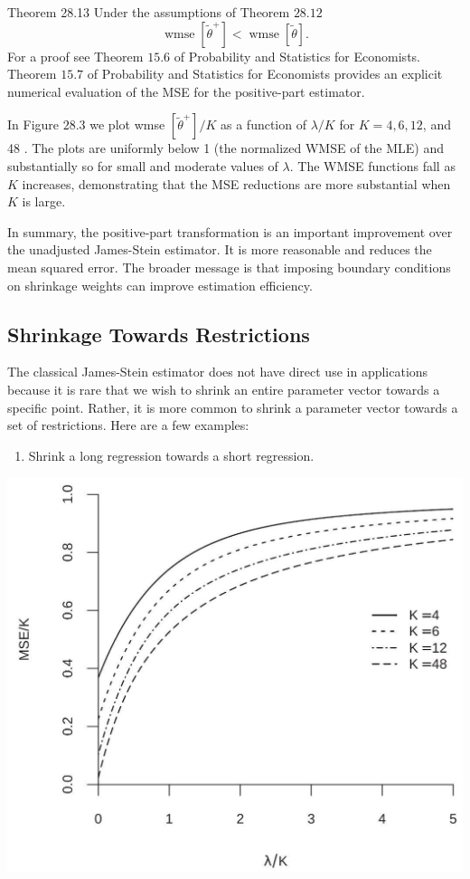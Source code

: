 \documentclass[10pt]{article}
\begin{document}
Theorem 28.13 Under the assumptions of Theorem $28.12$
$$
\operatorname{wmse}\left[\widetilde{\theta}^{+}\right]<\operatorname{wmse}[\tilde{\theta}] .
$$
For a proof see Theorem $15.6$ of Probability and Statistics for Economists. Theorem $15.7$ of Probability and Statistics for Economists provides an explicit numerical evaluation of the MSE for the positive-part estimator.

In Figure $28.3$ we plot wmse $\left[\widetilde{\theta}^{+}\right] / K$ as a function of $\lambda / K$ for $K=4,6,12$, and 48 . The plots are uniformly below 1 (the normalized WMSE of the MLE) and substantially so for small and moderate values of $\lambda$. The WMSE functions fall as $K$ increases, demonstrating that the MSE reductions are more substantial when $K$ is large.

In summary, the positive-part transformation is an important improvement over the unadjusted James-Stein estimator. It is more reasonable and reduces the mean squared error. The broader message is that imposing boundary conditions on shrinkage weights can improve estimation efficiency.

\subsection{Shrinkage Towards Restrictions}
The classical James-Stein estimator does not have direct use in applications because it is rare that we wish to shrink an entire parameter vector towards a specific point. Rather, it is more common to shrink a parameter vector towards a set of restrictions. Here are a few examples:

\begin{enumerate}
  \item Shrink a long regression towards a short regression.
\end{enumerate}
\includegraphics[max width=\textwidth]{2022_10_23_101d59f261a704807a3bg-30}
\end{document}

